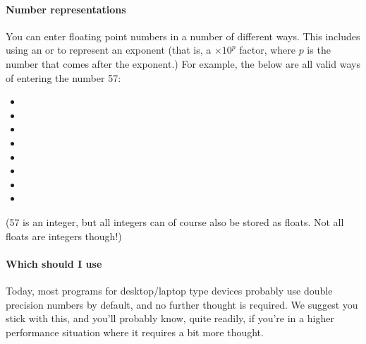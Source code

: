 \documentclass[letterpaper,10pt,british]{sphinxmanual}
\begin{document}
\paragraph{Number representations}
\label{\detokenize{chapters/programming_fundamentals/floating_point_numbers:number-representations}}
\sphinxAtStartPar
You can enter floating point numbers in a number of different ways. This includes using an  or  to represent an exponent (that is, a \(\times 10 ^{p}\) factor, where \(p\) is the number that comes after the exponent.) For example, the below are all valid ways of entering the number 57:
\begin{itemize}
\item {} 
\sphinxAtStartPar
{}

\item {} 
\sphinxAtStartPar
{}

\item {} 
\sphinxAtStartPar
{}

\item {} 
\sphinxAtStartPar
{}

\item {} 
\sphinxAtStartPar
{}

\item {} 
\sphinxAtStartPar
{}

\item {} 
\sphinxAtStartPar
{}

\item {} 
\sphinxAtStartPar
{}

\end{itemize}

\sphinxAtStartPar
(57 is an integer, but all integers can of course also be stored as floats. Not all floats are integers though!)


\paragraph{Which should I use}
\label{\detokenize{chapters/programming_fundamentals/floating_point_numbers:which-should-i-use}}
\sphinxAtStartPar
Today, most programs for desktop/laptop type devices probably use double precision numbers by default, and no further thought is required. We suggest you stick with this, and you’ll probably know, quite readily, if you’re in a higher performance situation where it requires a bit more thought.
\end{document}
